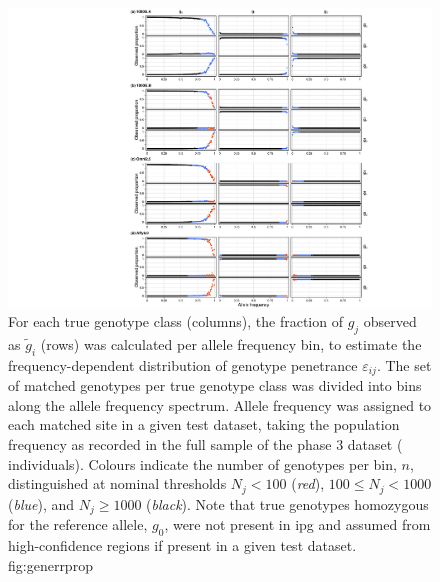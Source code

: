 

\begin{figure}[!htbp]
\includegraphics[width=\textwidth]{./img/ch4/generrprop}
%
{For each true genotype class (columns), the fraction of $g_j$ observed as $\tilde{g}_i$ (rows) was calculated per allele frequency bin, to estimate the frequency-dependent distribution of genotype penetrance $\varepsilon_{ij}$.
The set of matched genotypes per true genotype class was divided into  bins along the allele frequency spectrum.
Allele frequency was assigned to each matched site in a given test dataset, taking the population frequency as recorded in the full sample of the  phase 3 dataset ( individuals).
Colours indicate the number of genotypes per bin, $n$, distinguished at nominal thresholds ${N_j < 100}$ (\emph{red}), ${100 \leq N_j < 1000}$ (\emph{blue}), and ${N_j \geq 1000}$ (\emph{black}).
Note that true genotypes homozygous for the reference allele, $g_0$, were not present in \gls{ipg} and assumed from high-confidence regions if present in a given test dataset.}%
{fig:generrprop}
\end{figure}
